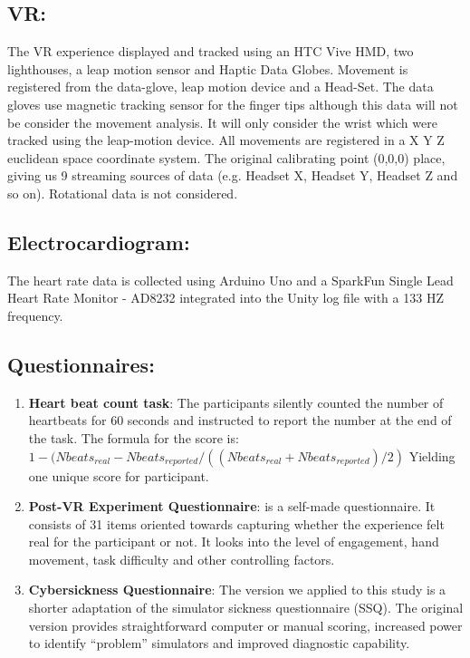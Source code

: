 \documentclass{article}
\begin{document}
\subsection{VR:} The VR experience displayed and tracked using an HTC Vive HMD, two lighthouses, a leap motion sensor and Haptic Data Globes. Movement is registered from the data-glove, leap motion device and a Head-Set. The data gloves use magnetic tracking sensor for the finger tips although this data will not be consider the movement analysis. It will only consider the wrist which were tracked using the leap-motion device. All movements are registered in a X Y Z euclidean space coordinate system. The original calibrating point (0,0,0) place, giving us 9 streaming sources of data (e.g. Headset X, Headset Y, Headset Z and so on). Rotational data is not considered. 
\subsection{Electrocardiogram:}  The heart rate data is collected using Arduino Uno and a SparkFun Single Lead Heart Rate Monitor - AD8232 integrated into the Unity log file with a 133 HZ frequency.  
\subsection{Questionnaires:} 
\begin{enumerate}
    \item \textbf{Heart beat count task}: The participants silently counted the number of heartbeats for 60 seconds and instructed to report the number at the end of the task. The formula for the score is: \ $ 1 - (Nbeats_{real}-Nbeats_{reported}/((Nbeats_{real}+Nbeats_{reported})/2)$  Yielding one unique score for participant\citep{GARFINKEL201565}.
    \item \textbf{Post-VR Experiment Questionnaire}: is a self-made questionnaire. It consists of 31 items oriented towards capturing whether the experience felt real for the participant or not. It looks into the level of engagement, hand movement, task difficulty and other controlling factors. 
    \item \textbf{Cybersickness Questionnaire}: The version we applied to this study is a shorter adaptation of the simulator sickness questionnaire (SSQ)\citep{SSQ93}. The original version provides straightforward computer or manual scoring, increased power to identify ``problem'' simulators and improved diagnostic capability.
\end{enumerate}
\end{document}
